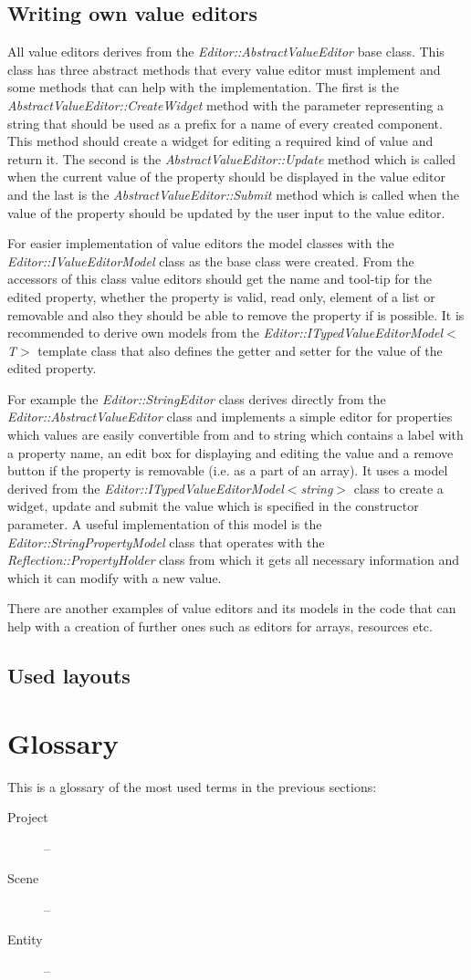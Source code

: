 \subsection{Writing own value editors}

All value editors derives from the \emph{Editor::AbstractValueEditor} base class. This class has three abstract methods that every value editor must implement and some methods that can help with the implementation. The first is the \emph{AbstractValueEditor::CreateWidget} method with the parameter representing a string that should be used as a prefix for a name of every created component. This method should create a widget for editing a required kind of value and return it. The second is the \emph{AbstractValueEditor::Update} method which is called when the current value of the property should be displayed in the value editor and the last is the \emph{AbstractValueEditor::Submit} method which is called when the value of the property should be updated by the user input to the value editor.

For easier implementation of value editors the model classes with the \emph{Editor::IValueEditorModel} class as the base class were created. From the accessors of this class value editors should get the name and tool-tip for the edited property, whether the property is valid, read only, element of a list or removable and also they should be able to remove the property if is possible. It is recommended to derive own models from the \emph{Editor::ITypedValueEditor\-Model$<$T$>$} template class that also defines the getter and setter for the value of the edited property.

For example the \emph{Editor::StringEditor} class derives directly from the \emph{Editor::AbstractValueEditor} class and implements a simple editor for properties which values are easily convertible from and to string which contains a label with a property name, an edit box for displaying and editing the value and a remove button if the property is removable (i.e. as a part of an array). It uses a model derived from the \emph{Editor::ITypedValueEditorModel$<$string$>$} class to create a widget, update and submit the value which is specified in the constructor parameter. A useful implementation of this model is the \emph{Editor::StringPropertyModel} class that operates with the \emph{Reflection::Property\-Holder} class from which it gets all necessary information and which it can modify with a new value.

There are another examples of value editors and its models in the code that can help with a creation of further ones such as editors for arrays, resources etc.

\subsection{Used layouts}

\section{Glossary}
This is a glossary of the most used terms in the previous sections:

\begin{description}
  \item[Project] -- 
  \item[Scene] --
  \item[Entity] -- 
\end{description}